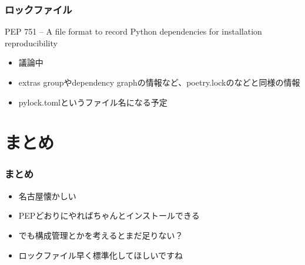 \documentclass[aspectratio=169]{beamer}
\begin{document}
\begin{frame}
\frametitle{ロックファイル}
PEP 751 – A file format to record Python dependencies for installation reproducibility
\begin{itemize}
\item 議論中
\item extras groupやdependency graphの情報など、poetry.lockのなどと同様の情報
\item pylock.tomlというファイル名になる予定
\end{itemize}
\end{frame}


\section{まとめ}
\begin{frame}
\frametitle{まとめ}
\begin{itemize}
\item 名古屋懐かしい
\item PEPどおりにやればちゃんとインストールできる
\item でも構成管理とかを考えるとまだ足りない？
\item ロックファイル早く標準化してほしいですね
\end{itemize}
\end{frame}
\end{document}
